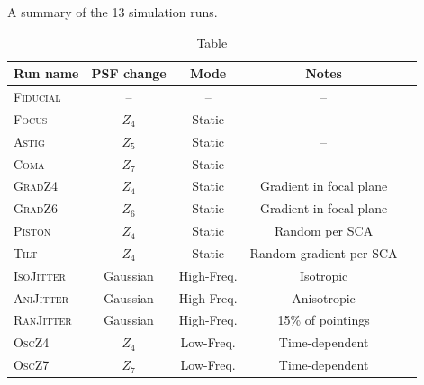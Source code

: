 \documentclass[aps,prd, amsmath,amssymb,superscriptaddress,showkeys,nofootinbib,reprint,preprintnumbers]{revtex4-1}
\begin{document}
\def\arraystretch{1.4}
\setlength{\tabcolsep}{4pt}
\begin{table}
\caption{Table} A summary of the 13 simulation runs.
\label{table:runs}
\begin{center}
\begin{tabular}{lcccc }
\hline
\hline
Run name & PSF change & Mode & Notes \\ 
\hline
\textsc{Fiducial}              & -- & -- & -- \\
\textsc{Focus}                & $Z_4$ & Static & --  \\
\textsc{Astig}                  & $Z_5$ & Static &  -- \\
\textsc{Coma}                & $Z_7$ & Static &  -- \\
\textsc{GradZ4}             & $Z_4$ & Static & Gradient in focal plane  \\
\textsc{GradZ6}              & $Z_6$ & Static &Gradient in focal plane    \\
\textsc{Piston} 		 & $Z_4$ & Static  &Random per SCA   \\
\textsc{Tilt} 			 & $Z_4$ & Static & Random gradient per SCA \\
\hline
\textsc{IsoJitter}		& Gaussian  & High-Freq. & Isotropic  \\
\textsc{AniJitter} 		 & Gaussian & High-Freq. & Anisotropic  \\
\textsc{RanJitter} 		 & Gaussian & High-Freq. & 15\% of pointings  \\
\hline
\textsc{OscZ4} 		 & $Z_4$ & Low-Freq. & Time-dependent  \\
\textsc{OscZ7} 		 & $Z_7$ & Low-Freq. & Time-dependent  \\
\hline
\hline
\end{tabular}
\end{center}
\end{table}
\end{document}
